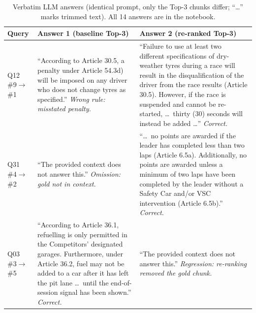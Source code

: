 \documentclass[11pt,a4paper]{article}
\begin{document}
\begin{table}[tbp]
\centering\small
\begin{tabularx}{\textwidth}{@{}p{1.2cm}LL@{}}
\toprule
Query & Answer 1 (baseline Top-3) & Answer 2 (re-ranked Top-3) \\
\midrule
Q12 \newline \#9$\to$\#1 & ``According to Article 30.5, a penalty under Article 54.3d) will be imposed on any driver who does not
change tyres as specified.'' \newline \emph{Wrong rule: misstated penalty.} &
``Failure to use at least two different specifications of dry-weather tyres during a race will result in the
disqualification of the driver from the race results (Article 30.5). However, if the race is suspended and cannot be
re-started, \ldots\ thirty (30) seconds will instead be added \ldots'' \newline \emph{Correct.} \\
\midrule
Q31 \newline \#4$\to$\#2 & ``The provided context does not answer this.'' \newline \emph{Omission: gold not in context.} &
``\ldots\ no points are awarded if the leader has completed less than two laps (Article 6.5a). Additionally, no
points are awarded unless a minimum of two laps have been completed by the leader without a Safety Car and/or VSC
intervention (Article 6.5b).'' \newline \emph{Correct.} \\
\midrule
Q03 \newline \#3$\to$\#5 & ``According to Article 36.1, refuelling is only permitted in the Competitors' designated
garages. Furthermore, under Article 36.2, fuel may not be added to a car after it has left the pit lane \ldots\
until the end-of-session signal has been shown.'' \newline \emph{Correct.} &
``The provided context does not answer this.'' \newline \emph{Regression: re-ranking removed the gold chunk.} \\
\bottomrule
\end{tabularx}
\caption{Verbatim LLM answers (identical prompt, only the Top-3 chunks differ; ``\ldots'' marks trimmed text). All 14
answers are in the notebook.}
\label{tab:answers}
\end{table}
\end{document}
